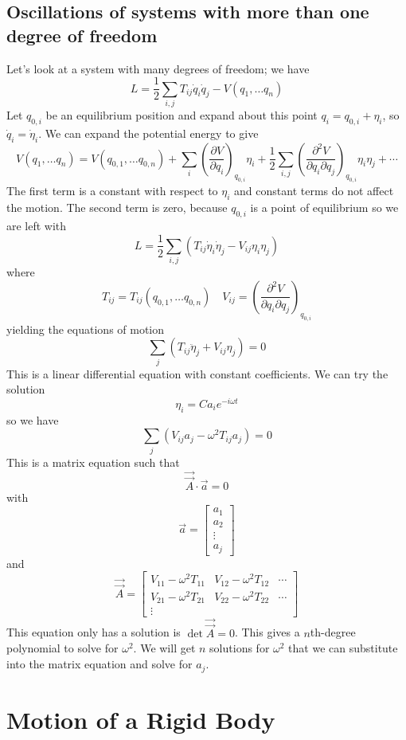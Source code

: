 \section{Oscillations of systems with more than one degree of freedom}
Let's look at a system with many degrees of freedom; we have
\[L={\frac {1}{2}}\sum _{i,j}T_{ij}{\dot {q}}_{i}{\dot {q}}_{j}-V\left(q_{1},\ldots q_{n}\right)\]
Let $q_{0,i}$ be an equilibrium position and expand about this point $q_{i}=q_{0,i}+\eta _{i}$, so $\dot{q}_{i}=\dot {\eta }_{i}$.
We can expand the potential energy to give
\[V\left(q_{1},\ldots q_{n}\right)=V\left(q_{0,1},\ldots q_{0,n}\right)+\sum _{i}\left({\frac {\partial V}{\partial q_{i}}}\right)_{q_{0,i}}\eta _{i}+{\frac {1}{2}}\sum _{i,j}\left({\frac {\partial ^{2}V}{\partial q_{i}\partial q_{j}}}\right)_{q_{0,i}}\eta _{i}\eta _{j}+\cdots\]
The first term is a constant with respect to $\eta_i$ and constant terms do not affect the motion. The second term is zero, because $q_{0,i}$ is a point of equilibrium so we are left with
\[L={\frac {1}{2}}\sum _{i,j}\left(T_{ij}{\dot {\eta }}_{i}{\dot {\eta }}_{j}-V_{ij}\eta _{i}\eta _{j}\right)\]
where
\[T_{ij}=T_{ij}\left(q_{0,1},\ldots q_{0,n}\right) \quad V_{ij}=\left({\frac {\partial ^{2}V}{\partial q_{i}\partial q_{j}}}\right)_{q_{0,i}}\]
yielding the equations of motion
\[\sum _{j}\left(T_{ij}{\ddot {\eta }}_{j} + V_{ij}\eta _{j}\right)=0\]
This is a linear differential equation with constant coefficients. We can try the solution
\[\eta _{i}=Ca_{i}e^{-i\omega t}\]
so we have
\[\sum _{j}\left(V_{ij}a_{j}-\omega ^{2}T_{ij}a_{j}\right)=0\]
This is a matrix equation such that
\[{\vec {\vec {A}}}\cdot {\vec {a}}=0\]
with
\[{\vec {a}}=\left[{\begin{matrix}a_{1}\\a_{2}\\\vdots \\a_{j}\end{matrix}}\right]\]
and
\[{\vec {\vec {A}}}=\left[{\begin{matrix}V_{11}-\omega ^{2}T_{11}&V_{12}-\omega ^{2}T_{12}&\cdots \\V_{21}-\omega ^{2}T_{21}&V_{22}-\omega ^{2}T_{22}&\cdots \\\vdots &&\end{matrix}}\right]\]
This equation only has a solution is $\det {\vec {\vec {A}}}=0$. This gives a $n$th-degree polynomial to solve for $\omega^2$. We will get $n$ solutions for $\omega^2$ that we can substitute into the matrix equation and solve for $a_j$.

\chapter{Motion of a Rigid Body}
